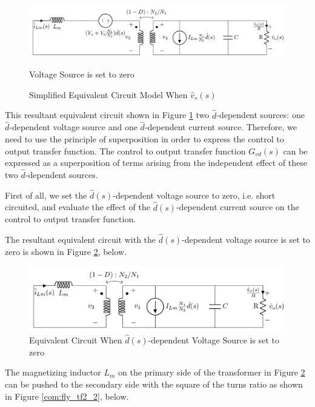 \begin{figure}[H]
\begin{center}
\includegraphics[width=1\textwidth]{Compensator/flyback_tf1_1.png}
\caption{Simplified Equivalent Circuit Model When $\hat{v}_s(s)$} Voltage Source is set to zero
\label{com:fly_tf1_1}
\end{center}
\end{figure}

This resultant equivalent circuit shown in Figure \ref{com:fly_tf1_1} two $\hat{d}$-dependent sources: one $\hat{d}$-dependent voltage source and one $\hat{d}$-dependent current source. Therefore, we need to use the principle of superposition in order to express the control to output transfer function. The control to output transfer function $G_{vd}(s)$ can be expressed as a superposition of terms arising from the independent effect of these two $\hat{d}$-dependent sources.

First of all, we set the $\hat{d}(s)$-dependent voltage source to zero, i.e. short circuited, and evaluate the effect of the $\hat{d}(s)$-dependent current source on the control to output transfer function.

The resultant equivalent circuit with the  $\hat{d}(s)$-dependent voltage source is set to zero is shown in Figure \ref{com:fly_tf2}, below.

\begin{figure}[H]
\begin{center}
\includegraphics[width=1\textwidth]{Compensator/flyback_tf2.png}
\caption{Equivalent Circuit When $\hat{d}(s)$-dependent Voltage Source is set to zero}
\label{com:fly_tf2}
\end{center}
\end{figure}

The magnetizing inductor $L_m$ on the primary side of the transformer in Figure \ref{com:fly_tf2} can be pushed to the secondary side with the square of the turns ratio as shown in Figure \ref{com:fly_tf2_2}, below.

